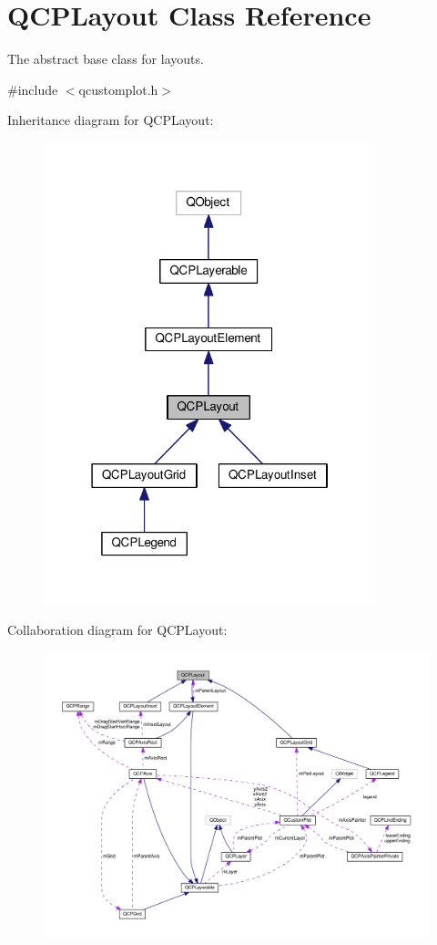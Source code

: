 \hypertarget{classQCPLayout}{}\section{Q\+C\+P\+Layout Class Reference}
\label{classQCPLayout}


The abstract base class for layouts.  




{\ttfamily \#include $<$qcustomplot.\+h$>$}



Inheritance diagram for Q\+C\+P\+Layout\+:
\nopagebreak
\begin{figure}[H]
\begin{center}
\leavevmode
\includegraphics[width=274pt]{classQCPLayout__inherit__graph}
\end{center}
\end{figure}


Collaboration diagram for Q\+C\+P\+Layout\+:
\nopagebreak
\begin{figure}[H]
\begin{center}
\leavevmode
\includegraphics[width=350pt]{classQCPLayout__coll__graph}
\end{center}
\end{figure}
